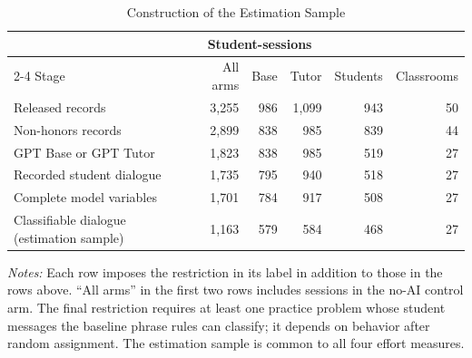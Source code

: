 \begin{table}[htbp]
\centering
\begingroup
{}
\small
\setlength{\tabcolsep}{5pt}
\caption{Construction of the Estimation Sample}
\label{tab:sample}
\begin{tabular}{lrrrrr}
\toprule
 & \multicolumn{3}{c}{Student-sessions} & & \\
\cmidrule(lr){2-4}
Stage & All arms & Base & Tutor & Students & Classrooms \\
\midrule
Released records & 3,255 & 986 & 1,099 & 943 & 50 \\
Non-honors records & 2,899 & 838 & 985 & 839 & 44 \\
GPT Base or GPT Tutor & 1,823 & 838 & 985 & 519 & 27 \\
Recorded student dialogue & 1,735 & 795 & 940 & 518 & 27 \\
Complete model variables & 1,701 & 784 & 917 & 508 & 27 \\
Classifiable dialogue (estimation sample) & 1,163 & 579 & 584 & 468 & 27 \\
\bottomrule
\end{tabular}
\par\medskip
\begin{minipage}{\linewidth}
\footnotesize
\textit{Notes:} Each row imposes the restriction in its label in addition to those in the rows above. ``All arms'' in the first two rows includes sessions in the no-AI control arm. The final restriction requires at least one practice problem whose student messages the baseline phrase rules can classify; it depends on behavior after random assignment. The estimation sample is common to all four effort measures.
\end{minipage}
\endgroup
\end{table}
